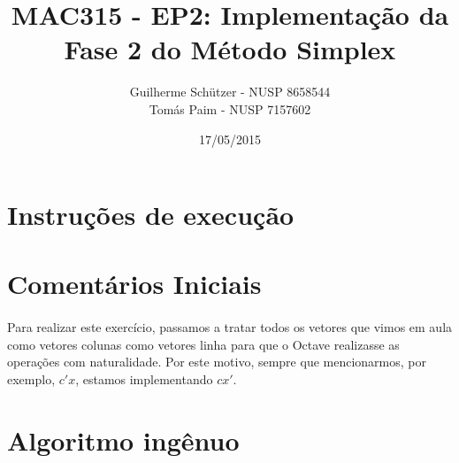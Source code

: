 \documentclass[a4paper]{article}
\title{MAC315 - EP2: Implementação da Fase 2 do Método Simplex}
\author{
	Guilherme Schützer - NUSP 8658544 \\
	Tomás Paim         - NUSP 7157602
}
\date{17/05/2015}
\begin{document}
\maketitle

\section{Instruções de execução}

\section{Comentários Iniciais}

\paragraph{}
Para realizar este exercício, passamos a tratar todos os vetores que vimos em aula como vetores colunas como vetores linha para que o Octave realizasse as operações com naturalidade. Por este motivo, sempre que mencionarmos, por exemplo, $c'x$, estamos implementando $cx'$.

\section{Algoritmo ingênuo}
\end{document}
